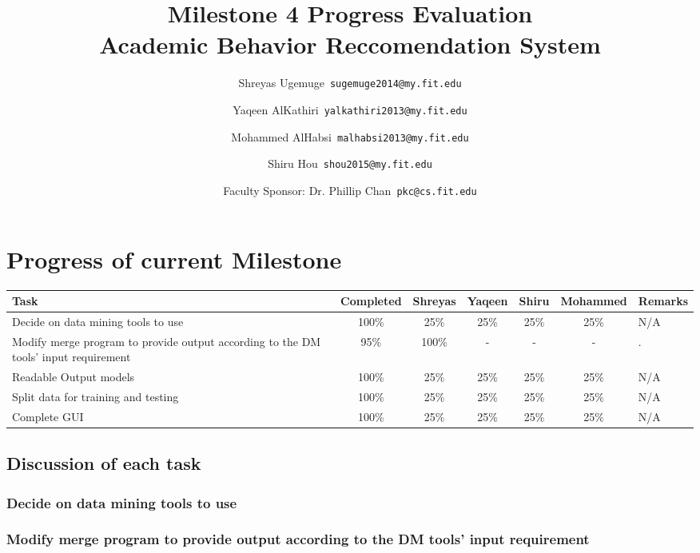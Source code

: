 \documentclass[12pt]{article}
\begin{document}
	\title{\textbf{Milestone 4 Progress Evaluation} \\ \hfill \break
	Academic Behavior Reccomendation System}
	\author{Shreyas Ugemuge\      \texttt{sugemuge2014@my.fit.edu}
  \and
  Yaqeen AlKathiri\      \texttt{yalkathiri2013@my.fit.edu}
  \and
	Mohammed AlHabsi\      \texttt{malhabsi2013@my.fit.edu}
  \and
  Shiru Hou\      \texttt{shou2015@my.fit.edu}
  \and
  Faculty Sponsor: Dr. Phillip Chan\      \texttt{pkc@cs.fit.edu}}
	\maketitle
	\pagebreak
	\singlespacing
	\tableofcontents
	\pagebreak
	\section{Progress of current Milestone}
	\begin{tabularx}{\textwidth}{|X|c|c|c|c|c|X|}
	\hline
		\textbf{Task} & \textbf{Completed} &\textbf{Shreyas} & \textbf{Yaqeen} & \textbf{Shiru} & \textbf{Mohammed} & \textbf{Remarks}  \\ \hline
			Decide on data mining tools to use &100\% & 25\% & 25\% & 25\% & 25\% & N/A \\ \hline
			Modify merge program to provide output according to the DM tools' input requirement & 95\% & 100\% & - & - & - & . \\ \hline
		
		Readable Output models & 100\% & 25\% & 25\% & 25\% & 25\% & N/A\\ \hline
		Split data for training and testing & 100\% & 25\% & 25\% & 25\% & 25\% & N/A \\ \hline
		Complete GUI & 100\% & 25\% & 25\% & 25\% & 25\% & N/A \\ \hline
		
	\end{tabularx}
	\subsection{Discussion of each task}
	\subsubsection{Decide on data mining tools to use }
		
	\subsubsection{Modify merge program to provide output according to the DM tools' input requirement}
\end{document}
